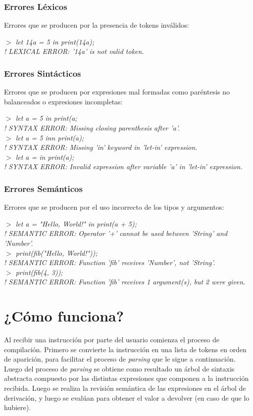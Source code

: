 \documentclass[12pt]{article}
\newcommand{\ini}{$>$ }
\begin{document}
\subsubsection*{Errores Léxicos}
	Errores que se producen por la presencia de tokens inválidos:
	
	\emph{
	\ini let 14a = 5 in print(14a); \\
	! LEXICAL ERROR: '14a' is not valid token.
	}

\subsubsection*{Errores Sintácticos}
	Errores que se producen por expresiones mal formadas como paréntesis no balanceados o expresiones incompletas:
	
	\emph{
	\ini let a = 5 in print(a; \\
	! SYNTAX ERROR: Missing closing parenthesis after 'a'. \\
	\ini let a = 5 inn print(a); \\
	! SYNTAX ERROR: Missing 'in' keyword in 'let-in' expression. \\
	\ini let a = in print(a); \\
	! SYNTAX ERROR: Invalid expression after variable 'a' in 'let-in' expression.
	}

\subsubsection*{Errores Semánticos}
	Errores que se producen por el uso incorrecto de los tipos y argumentos:
	
	\emph{
	\ini let a = "Hello, World!" in print(a + 5); \\
	! SEMANTIC ERROR: Operator '+' cannot be used between 'String' and 'Number'. \\
	\ini print(fib("Hello, World!")); \\
	! SEMANTIC ERROR: Function 'fib' receives 'Number', not 'String'. \\
	\ini print(fib(4, 3)); \\
	! SEMANTIC ERROR: Function 'fib' receives 1 argument(s), but 2 were given.
	}

\section*{¿Cómo funciona?}
	Al recibir una instrucción por parte del usuario comienza el proceso de compilación.
	Primero se convierte la instrucción en una lista de tokens en orden de aparición, para facilitar el proceso de \textit{parsing} que le sigue a continuación.
	Luego del proceso de \textit{parsing} se obtiene como resultado un árbol de sintaxis abstracta compuesto por las distintas expresiones que componen a la instrucción recibida.
	Luego se realiza la revisión semántica de las expresiones en el árbol de derivación, y luego se evalúan para obtener el valor a devolver (en caso de que lo hubiere).
	
\end{document}
